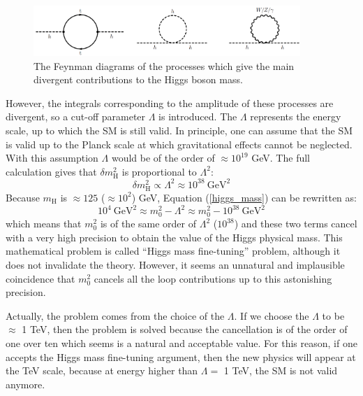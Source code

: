 \begin{enumerate}
\begin{figure}[!htbp]
\begin{center}
\includegraphics[width=0.9\textwidth]{figures/theory/higgs_loop.png}%
\caption{The Feynman diagrams of the processes which give the main divergent contributions to the Higgs boson mass.}
\end{center}
\label{ren_higgs}
\end{figure}


However, the integrals corresponding to the amplitude of these processes are divergent, so a cut-off parameter $\Lambda$ is introduced. The $\Lambda$ represents the energy scale, up to which the SM is still valid. In principle, one can assume that the SM is valid up to the Planck scale at which gravitational effects cannot be neglected. With this assumption $\Lambda$ would be of the order of $\approx 10^{19}$ GeV. The full calculation gives that $\delta m^2_\mathrm{H}$ is proportional to $\Lambda^2$:
\begin{equation}
\delta m^2_\mathrm{H} \propto \Lambda^2 \approx 10^{38}~\mathrm{GeV^2}
\end{equation}
Because $m_\mathrm{H}$ is $\approx 125$ ($\approx 10^2$) GeV, Equation (\ref{higgs_mass}) can be rewritten as:
$$10^4~\mathrm{GeV^2} \approx  m^{2}_0 -\Lambda^2 \approx m^2_0 -10^{38}~\mathrm{GeV^2}$$
which means that $m^2_0$ is of the same order of $\Lambda^2$ ($10^{38}$) and these two terms
cancel with a very high precision to obtain the value of the Higgs physical mass. This
mathematical problem is called ``Higgs mass fine-tuning'' problem, although it does not invalidate the theory. However, it seems an unnatural and implausible coincidence that $m^2_0$ cancels all the loop contributions up to this astonishing precision.

Actually, the problem comes from the choice of the $\Lambda$. If we choose the $\Lambda$ to be $\approx$ 1 TeV, then the problem is solved because the cancellation is of the order of one over ten which seems is a natural and acceptable value.
For this reason, if one accepts the Higgs mass fine-tuning argument, then the new physics will appear at the TeV scale, because at energy higher than $\Lambda=$ 1 TeV, the SM is not valid anymore.





\end{enumerate}
